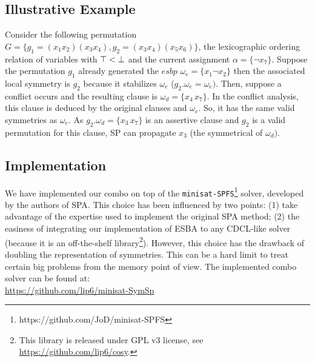 \subsection{Illustrative Example}
Consider the following permutation $G = \{ g_1 = (x_1 x_2) (x_3 x_4)  , g_2 = (x_3 x_4) (x_5 x_6) \}$,
the lexicographic ordering relation of variables with $\top < \bot$ and 
the current assignment $\alpha = \{\neg x_7 \}$.
Suppose the permutation $g_1$ already generated the $esbp$ $\omega_e = \{ x_1 \neg x_2\}$ then the associated local symmetry is 
$g_2$ because it stabilizes $\omega_e$ ($g_2.\omega_e = \omega_e)$. Then, suppose a conflict occurs and the resulting clause is
$\omega_d = \{x_4\, x_7\}$. In the conflict analysis, this clause is deduced by the original clauses and $\omega_e$.
 So, it has the same valid symmetries as $\omega_e$. As $g_2.\omega_d = \{x_3\, x_7\}$ is an assertive clause and $g_2$ is a valid 
 permutation for this clause, SP can propagate $x_3$ (the symmetrical of $\omega_d)$.

\subsection{Implementation}
We have implemented our combo on top of the
\texttt{minisat-SPFS}\footnote{https://github.com/JoD/minisat-SPFS} solver,
developed by the authors of SPA.
This choice has been influenced by two points: (1) take advantage of the
expertise used to implement the original SPA method; (2) the easiness of
integrating our implementation of ESBA to any CDCL-like solver (because it is an
off-the-shelf library\footnote{This library is released under GPL v3 license,
see \url{https://github.com/lip6/cosy}.}).
However, this choice has the drawback of doubling the representation of
symmetries. This can be a hard limit to treat certain big problems from the
memory point of view.
The implemented combo solver can be found at:\\
\mbox{\url{https://github.com/lip6/minisat-SymSp}}

